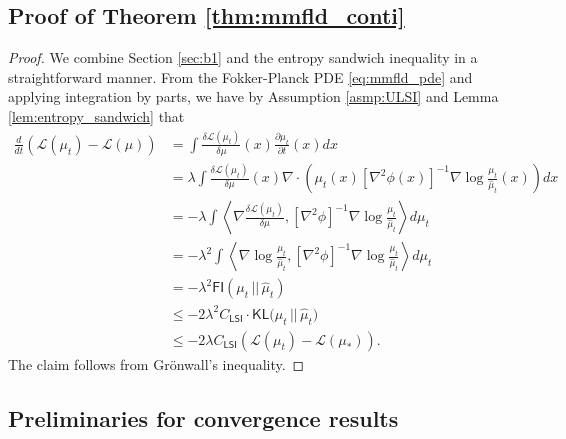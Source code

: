 \documentclass{article}
\newcommand{\CLSI}[0]{C_{\mathsf{LSI}}}
\newcommand{\sep}[0]{\,||\,}
\newcommand{\KL}[0]{\mathsf{KL}}
\newcommand{\FI}[0]{\mathsf{FI}}
\begin{document}
\subsection{Proof of Theorem \ref{thm:mmfld_conti}}\label{app:proofconti}

\begin{proof}
We combine Section \ref{sec:b1} and the entropy sandwich inequality in a straightforward manner. From the Fokker-Planck PDE \eqref{eq:mmfld_pde} and applying integration by parts, we have by Assumption \ref{asmp:ULSI} and Lemma \ref{lem:entropy_sandwich} that
    \begin{align*}
        \frac{d}{dt}(\mathcal{L}(\mu_t) - \mathcal{L}(\mu)) &= \int \frac{\delta \mathcal{L}(\mu_t)}{\delta\mu}(x)\frac{\partial\mu_t}{\partial t}(x)dx\\
        &= \lambda \int \frac{\delta\mathcal{L}(\mu_t)}{\delta\mu}(x)\nabla \cdot \left(\mu_t(x)[\nabla^2\phi(x)]^{-1}\nabla \log \frac{\mu_t}{\hat{\mu}_t}(x)\right)dx\\
        &= -\lambda\int \left\langle \nabla\frac{\delta\mathcal{L}(\mu_t)}{\delta\mu},[\nabla^2\phi]^{-1}\nabla \log \frac{\mu_t}{\hat{\mu}_t} \right\rangle d\mu_t\\
        &=  -\lambda^2\int \left\langle \nabla \log \frac{\mu_t}{\hat{\mu}_t} ,[\nabla^2\phi]^{-1}\nabla \log \frac{\mu_t}{\hat{\mu}_t} \right\rangle d\mu_t\\
        &= - \lambda^2{\FI(\mu_t\sep\hat{\mu}_t)}\\
        &\le -2\lambda^2\CLSI\cdot {\KL(\mu_t\sep\hat{\mu}_t})\\
        &\le -2\lambda\CLSI(\mathcal{L}(\mu_t) - \mathcal{L}(\mu_*)).
    \end{align*}
    The claim follows from Gr\"onwall's inequality.
\end{proof}


\subsection{Preliminaries for convergence results}
\end{document}
